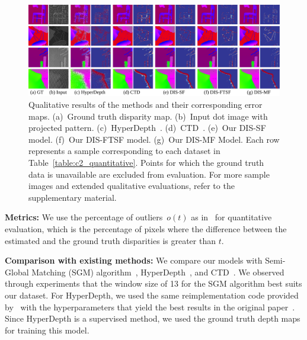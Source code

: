\begin{figure}
    \begin{center}
        \includegraphics[width=1\linewidth]{images/chapter2/figures/Fig4.jpg}
    \end{center}
   \caption{Qualitative results of the methods and their corresponding error maps. (a)~Ground truth disparity map. (b)~Input dot image with projected pattern. (c)~HyperDepth~\cite{ryan2016hyperdepth}. (d)~CTD~\cite{riegler2019connecting}. (e)~Our DIS-SF model. (f)~Our DIS-FTSF model. (g)~Our DIS-MF Model. Each row represents a sample corresponding to each dataset in Table~\ref{table:c2_quantitative}. Points for which the ground truth data is unavailable are excluded from evaluation. For more sample images and extended qualitative evaluations, refer to the supplementary material.}
    \label{fig:c2_results}
\end{figure}

\bigbreak\noindent\textbf{Metrics:} We use the percentage of outliers~$o(t)$ as in~\cite{riegler2019connecting} for quantitative evaluation, which is the percentage of pixels where the difference between the estimated and the ground truth disparities is greater than $t$.

\bigbreak\noindent\textbf{Comparison with existing methods:} We compare our models with Semi-Global Matching (SGM) algorithm~\cite{hirschmuller2007stereo}, HyperDepth~\cite{ryan2016hyperdepth}, and CTD~\cite{riegler2019connecting}. We observed through experiments that the window size of 13 for the SGM algorithm best suits our dataset. For HyperDepth, we used the same reimplementation code provided by~\cite{riegler2019connecting} with the hyperparameters that yield the best results in the original paper~\cite{ryan2016hyperdepth}. Since HyperDepth is a supervised method, we used the ground truth depth maps for training this model.

